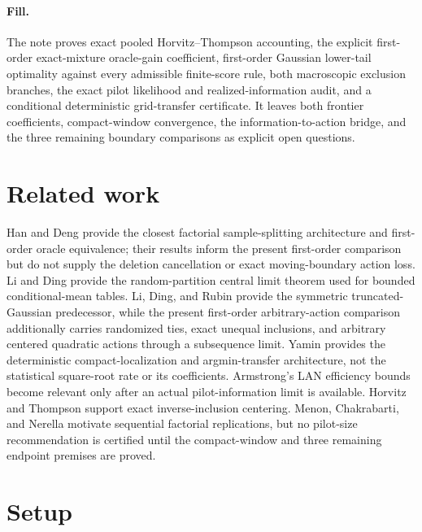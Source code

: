 \documentclass{article}
\begin{document}
\paragraph{Fill.} The note proves exact pooled Horvitz--Thompson accounting, the explicit first-order exact-mixture oracle-gain coefficient, first-order Gaussian lower-tail optimality against every admissible finite-score rule, both macroscopic exclusion branches, the exact pilot likelihood and realized-information audit, and a conditional deterministic grid-transfer certificate. It leaves both frontier coefficients, compact-window convergence, the information-to-action bridge, and the three remaining boundary comparisons as explicit open questions.

\section{Related work}

Han and Deng provide the closest factorial sample-splitting architecture and first-order oracle equivalence; their results inform the present first-order comparison but do not supply the deletion cancellation or exact moving-boundary action loss.  Li and Ding provide the random-partition central limit theorem used for bounded conditional-mean tables.  Li, Ding, and Rubin provide the symmetric truncated-Gaussian predecessor, while the present first-order arbitrary-action comparison additionally carries randomized ties, exact unequal inclusions, and arbitrary centered quadratic actions through a subsequence limit.  Yamin provides the deterministic compact-localization and argmin-transfer architecture, not the statistical square-root rate or its coefficients.  Armstrong's LAN efficiency bounds become relevant only after an actual pilot-information limit is available.  Horvitz and Thompson support exact inverse-inclusion centering.  Menon, Chakrabarti, and Nerella motivate sequential factorial replications, but no pilot-size recommendation is certified until the compact-window and three remaining endpoint premises are proved.

\section{Setup}
\end{document}
